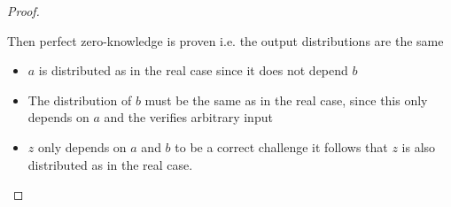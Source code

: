 \begin{itemize}
\begin{proof}
\begin{itemize}
    \end{itemize}
    Then perfect zero-knowledge is proven i.e. the output distributions are the same
    \begin{itemize}
      \item $a$ is distributed as in the real case since it does not depend $b$
      \item The distribution of $b$ must be the same as in the real case, since this only depends on $a$ and the verifies arbitrary input
      \item $z$ only depends on $a$ and $b$ to be a correct challenge it follows that $z$ is also distributed as in the real case. 
    \end{itemize}
  \end{proof}
\end{itemize}

\newpage

